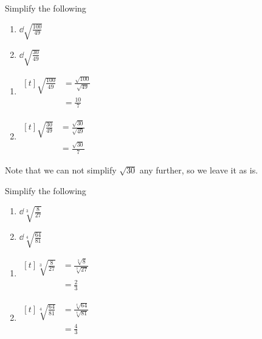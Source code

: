 \begin{myexample}
Simplify the following
\begin{multicols}{2}
	\begin{enumerate}
		\item $\dd\sqrt{\frac{100}{49}}$
		\item $\dd\sqrt{\frac{30}{49}}$
	\end{enumerate} 
\end{multicols}
\end{myexample}
\begin{myProof}
	\begin{enumerate}
		\item 
		$\begin{aligned}[t]
			\sqrt{\frac{100}{49}} & =  \frac{\sqrt{100}}{\sqrt{49}} \\
			                      & = \frac{10}{7}                  
		\end{aligned}$
		\item 
		$\begin{aligned}[t]
			\sqrt{\frac{30}{49}} & =  \frac{\sqrt{30}}{\sqrt{49}} \\
			                     & =  \frac{\sqrt{30}}{7}         
		\end{aligned}$
	\end{enumerate} 
			
	Note that we can not simplify $\sqrt{30}$ any further, so we leave it as is.
				
\end{myProof} 

\begin{myexample}
Simplify the following
\begin{multicols}{2}
	\begin{enumerate}
		\item $\dd\sqrt[3]{\frac{8}{27}}$
		\item $\dd\sqrt[4]{\frac{64}{81}}$
	\end{enumerate}
\end{multicols}
{}
\end{myexample}
\begin{myProof}
	\begin{enumerate}
		\item 
		$\begin{aligned}[t]
			\sqrt[3]{\frac{8}{27}} & =  \frac{\sqrt[3]{8}}{\sqrt[3]{27}} \\
			                       & =  \frac{2}{3}                      
		\end{aligned}$
		\item 
		$\begin{aligned}[t]
			\sqrt[4]{\frac{64}{81}} & =  \frac{\sqrt[4]{64}}{\sqrt[4]{81}} \\
			                        & =  \frac{4}{3}                       
		\end{aligned}$
	\end{enumerate} 
\end{myProof}

